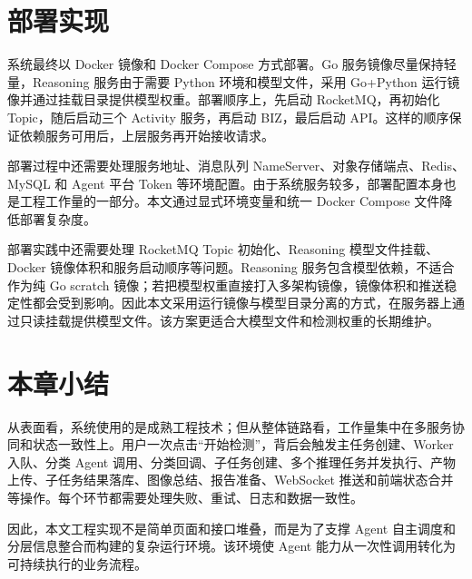 \section{部署实现}
\label{sec:impl-deployment}

系统最终以 Docker 镜像和 Docker Compose 方式部署。Go 服务镜像尽量保持轻量，Reasoning 服务由于需要 Python 环境和模型文件，采用 Go+Python 运行镜像并通过挂载目录提供模型权重。部署顺序上，先启动 RocketMQ，再初始化 Topic，随后启动三个 Activity 服务，再启动 BIZ，最后启动 API。这样的顺序保证依赖服务可用后，上层服务再开始接收请求。

部署过程中还需要处理服务地址、消息队列 NameServer、对象存储端点、Redis、MySQL 和 Agent 平台 Token 等环境配置。由于系统服务较多，部署配置本身也是工程工作量的一部分。本文通过显式环境变量和统一 Docker Compose 文件降低部署复杂度。

部署实践中还需要处理 RocketMQ Topic 初始化、Reasoning 模型文件挂载、Docker 镜像体积和服务启动顺序等问题。Reasoning 服务包含模型依赖，不适合作为纯 Go scratch 镜像；若把模型权重直接打入多架构镜像，镜像体积和推送稳定性都会受到影响。因此本文采用运行镜像与模型目录分离的方式，在服务器上通过只读挂载提供模型文件。该方案更适合大模型文件和检测权重的长期维护。

\section{本章小结}
\label{sec:impl-complexity-summary}

从表面看，系统使用的是成熟工程技术；但从整体链路看，工作量集中在多服务协同和状态一致性上。用户一次点击“开始检测”，背后会触发主任务创建、Worker 入队、分类 Agent 调用、分类回调、子任务创建、多个推理任务并发执行、产物上传、子任务结果落库、图像总结、报告准备、WebSocket 推送和前端状态合并等操作。每个环节都需要处理失败、重试、日志和数据一致性。

因此，本文工程实现不是简单页面和接口堆叠，而是为了支撑 Agent 自主调度和分层信息整合而构建的复杂运行环境。该环境使 Agent 能力从一次性调用转化为可持续执行的业务流程。

